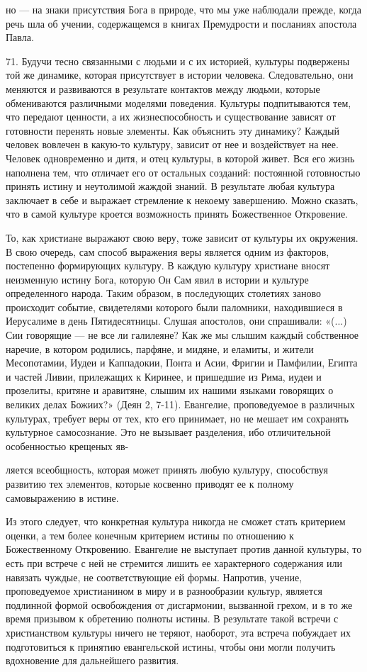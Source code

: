 \documentclass[a5paper,10pt]{article}
\begin{document}
но — на знаки присутствия Бога в природе, что мы уже наблюдали прежде, когда
речь шла об учении, содержащемся в книгах Премудрости и посланиях апостола
Павла.

71. Будучи тесно связанными с людьми и с их историей, культуры подвержены той
же динамике, которая присутствует в истории человека. Следовательно, они
меняются и развиваются в результате контактов между людьми, которые
обмениваются различными моделями поведения. Культуры подпитываются тем, что
передают ценности, а их жизнеспособность и существование зависят от готовности
перенять новые элементы. Как объяснить эту динамику? Каждый человек вовлечен в
какую-то культуру, зависит от нее и воздействует на нее. Человек одновременно и
дитя, и отец культуры, в которой живет. Вся его жизнь наполнена тем, что
отличает его от остальных созданий: постоянной готовностью принять истину и
неутолимой жаждой знаний. В результате любая культура заключает в себе и
выражает стремление к некоему завершению. Можно сказать, что в самой культуре
кроется возможность принять Божественное Откровение.

То, как христиане выражают свою веру, тоже зависит от культуры их окружения. В
свою очередь, сам способ выражения веры является одним из факторов, постепенно
формирующих культуру. В каждую культуру христиане вносят неизменную истину
Бога, которую Он Сам явил в истории и культуре определенного народа. Таким
образом, в последующих столетиях заново происходит событие, свидетелями
которого были паломники, находившиеся в Иерусалиме в день Пятидесятницы. Слушая
апостолов, они спрашивали: «(...) Сии говорящие — не все ли галилеяне? Как же
мы слышим каждый собственное наречие, в котором родились, парфяне, и мидяне, и
еламиты, и жители Месопотамии, Иудеи и Каппадокии, Понта и Асии, Фригии и
Памфилии, Египта и частей Ливии, прилежащих к Киринее, и пришедшие из Рима,
иудеи и прозелиты, критяне и аравитяне, слышим их нашими языками говорящих о
великих делах Божиих?» (Деян 2, 7-11). Евангелие, проповедуемое в различных
культурах, требует веры от тех, кто его принимает, но не мешает им сохранять
культурное самосознание. Это не вызывает разделения, ибо отличительной
особенностью крещеных яв-

ляется всеобщность, которая может принять любую культуру, способствуя развитию
тех элементов, которые косвенно приводят ее к полному самовыражению в истине.

Из этого следует, что конкретная культура никогда не сможет стать критерием
оценки, а тем более конечным критерием истины по отношению к Божественному
Откровению. Евангелие не выступает против данной культуры, то есть при встрече
с ней не стремится лишить ее характерного содержания или навязать чуждые, не
соответствующие ей формы. Напротив, учение, проповедуемое христианином в миру и
в разнообразии культур, является подлинной формой освобождения от дисгармонии,
вызванной грехом, и в то же время призывом к обретению полноты истины. В
результате такой встречи с христианством культуры ничего не теряют, наоборот,
эта встреча побуждает их подготовиться к принятию евангельской истины, чтобы
они могли получить вдохновение для дальнейшего развития.
\end{document}
